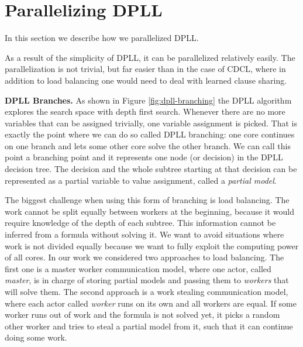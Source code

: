 \documentclass[letterpaper]{article}
\newcommand{\mypar}[1]{{\bf #1.}}
\begin{document}
\section{Parallelizing DPLL}\label{sec:parallel_dpll}
In this section we describe how we parallelized DPLL.

As a result of the simplicity of DPLL, it can be parallelized relatively easily.
The parallelization is not trivial, but far easier than in the case of CDCL, where in addition to load balancing one would need to deal with learned clause sharing.

\mypar{DPLL Branches}
As shown in Figure \ref{fig:dpll-branching} the DPLL algorithm explores the search space with depth first search.
Whenever there are no more variables that can be assigned trivially, one variable assignment is picked.
That is exactly the point where we can do so called DPLL branching: one core continues on one branch and lets some other core solve the other branch.
We can call this point a branching point and it represents one node (or decision) in the DPLL decision tree.
The decision and the whole subtree starting at that decision can be represented as a partial variable to value assignment, called a \textit{partial model}.

The biggest challenge when using this form of branching is load balancing.
The work cannot be split equally between workers at the beginning, because it would require knowledge of the depth of each subtree.
This information cannot be inferred from a formula without solving it.
We want to avoid situations where work is not divided equally because we want to fully exploit the computing power of all cores.
In our work we considered two approaches to load balancing.
The first one is a master worker communication model, where one actor, called \textit{master}, is in charge of storing partial models and passing them to \textit{workers} that will solve them.
The second approach is a work stealing communication model, where each actor called \textit{worker} runs on its own and all workers are equal.
If some worker runs out of work and the formula is not solved yet, it picks a random other worker and tries to steal a partial model from it, such that it can continue doing some work.
\end{document}
